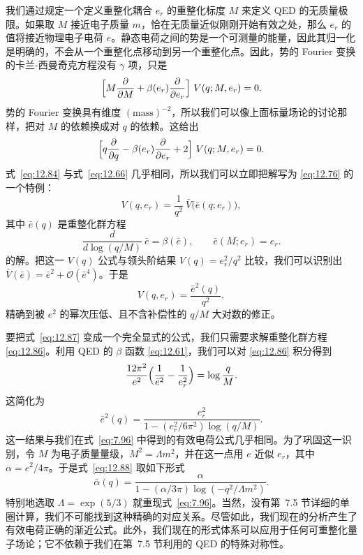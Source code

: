 我们通过规定一个定义重整化耦合 $e_r$ 的重整化标度 $M$ 来定义 QED 的无质量极限。如果取 $M$ 接近电子质量 $m$，恰在无质量近似刚刚开始有效之处，那么 $e_r$ 的值将接近物理电子电荷 $e$。静态电荷之间的势是一个可测量的能量，因此其归一化是明确的，不会从一个重整化点移动到另一个重整化点。因此，势的 Fourier 变换的卡兰-西曼奇克方程没有 $\gamma$ 项，只是
\begin{equation}
  \Bigl[ M\frac{\partial}{\partial M} + \beta(e_r)\frac{\partial}
    {\partial e_r} \Bigr]\ V(q; M, e_r) = 0 .
  \label{eq:12.83}
\end{equation}
势的 Fourier 变换具有维度 $(\mathrm{mass})^{-2}$，所以我们可以像上面标量场论的讨论那样，把对 $M$ 的依赖换成对 $q$ 的依赖。这给出
\begin{equation}
  \Bigl[ q\frac{\partial}{\partial q} - \beta(e_r)\frac{\partial}{\partial
    e_r} + 2 \Bigr]\ V(q; M, e_r) = 0 .
  \label{eq:12.84}
\end{equation}
式~\eqref{eq:12.84} 与式~\eqref{eq:12.66} 几乎相同，所以我们可以立即把解写为 \eqref{eq:12.76} 的一个特例：
\begin{equation}
  V(q, e_r) = \frac{1}{q^2}\ \bar{V}\bigl( \bar{e}(q; e_r) \bigr) ,
  \label{eq:12.85}
\end{equation}
其中 $\bar{e}(q)$ 是重整化群方程
\begin{equation}
  \frac{d}{d\log(q/M)}\ \bar{e} = \beta(\bar{e}),\qquad
  \bar{e}(M; e_r) = e_r .
  \label{eq:12.86}
\end{equation}
的解。把这一 $V(q)$ 公式与领头阶结果 $V(q) = e_r^2/q^2$ 比较，我们可以识别出 $\bar{V}(\bar{e}) = \bar{e}^2 + \mathcal{O}(\bar{e}^4)$。于是
\begin{equation}
  V(q, e_r) = \frac{\bar{e}^2(q)}{q^2} ,
  \label{eq:12.87}
\end{equation}
精确到被 $e^2$ 的幂次压低、且不含补偿性的 $q/M$ 大对数的修正。

要把式~\eqref{eq:12.87} 变成一个完全显式的公式，我们只需要求解重整化群方程 \eqref{eq:12.86}。利用 QED 的 $\beta$ 函数 \eqref{eq:12.61}，我们可以对 \eqref{eq:12.86} 积分得到
\begin{equation}
  \frac{12\pi^2}{e^2}\Bigl( \frac{1}{\bar{e}^2} - \frac{1}{e_r^2} \Bigr)
  = \log\frac{q}{M} .
\end{equation}
这简化为
\begin{equation}
  \bar{e}^2(q) = \frac{e_r^2}{1 - (e_r^2/6\pi^2)\log(q/M)} .
  \label{eq:12.88}
\end{equation}
这一结果与我们在式~\eqref{eq:7.96} 中得到的有效电荷公式几乎相同。为了巩固这一识别，令 $M$ 为电子质量量级，$M^2 = \Lambda m^2$，并在这一点用 $e$ 近似 $e_r$，其中 $\alpha = e^2/4\pi$。于是式~\eqref{eq:12.88} 取如下形式
\begin{equation}
  \bar{\alpha}(q) = \frac{\alpha}{1 - (\alpha/3\pi)\log(-q^2/\Lambda m^2)} .
  \label{eq:12.89}
\end{equation}
特别地选取 $\Lambda = \exp(5/3)$ 就重现式~\eqref{eq:7.96}。当然，没有第~7.5 节详细的单圈计算，我们不可能找到这种精确的对应关系。尽管如此，我们现在的分析产生了有效电荷正确的渐近公式。此外，我们现在的形式体系可以应用于任何可重整化量子场论；它不依赖于我们在第~7.5 节利用的 QED 的特殊对称性。

